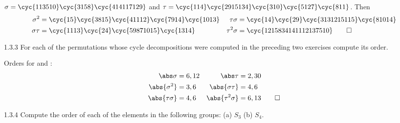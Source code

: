 \begin{sol}
    $\sigma = \cyc{1 13 5 10}\cyc{3 15 8}\cyc{4 14 11 7 12 9}$ and $\tau = \cyc{1 14}\cyc{2 9 15 13 4}\cyc{3 10}\cyc{5 12 7}\cyc{8 11}$. Then
    \begin{align*}
        \sigma^2 & = \cyc{1 5}\cyc{3 8 15}\cyc{4 11 12}\cyc{7 9 14}\cyc{10 13} & \tau\sigma & = \cyc{1 4}\cyc{2 9}\cyc{3 13 12 15 11 5}\cyc{8 10 14} \\
        \sigma\tau & = \cyc{1 11 3}\cyc{2 4}\cyc{5 9 8 7 10 15}\cyc{13 14} & \tau^2\sigma & = \cyc{1 2 15 8 3 4 14 11 12 13 7 5 10} \qedhere
    \end{align*}
\end{sol}

\begin{exercise}{1.3.3}
    For each of the permutations whose cycle decompositions were computed in the preceding two exercises compute its order.
\end{exercise}

\begin{sol}
    Orders for  and :
    \begin{align*}
        \abs\sigma & = 6, 12 & \abs\tau & = 2, 30 \\
        \abs{\sigma^2} & = 3, 6 & \abs{\sigma\tau} & = 4, 6 \\
        \abs{\tau\sigma} & = 4, 6 & \abs{\tau^2\sigma} & = 6, 13 \qedhere
    \end{align*}
\end{sol}

\begin{exercise}{1.3.4}
    Compute the order of each of the elements in the following groups:
    (a) $S_3$ \quad (b) $S_4$.
\end{exercise}

